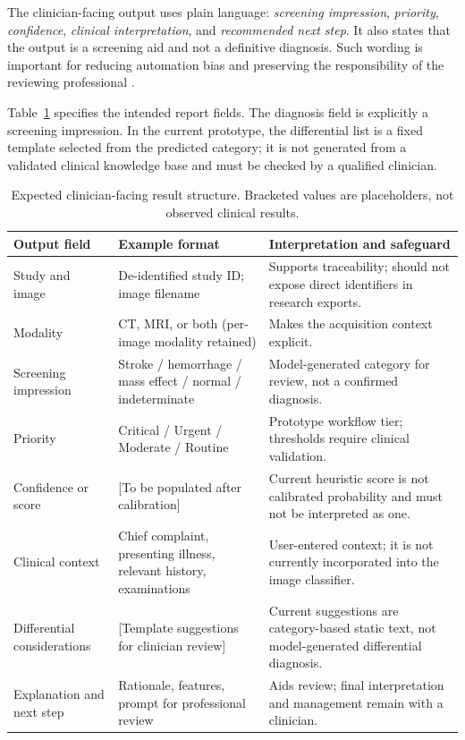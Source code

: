 \documentclass[10pt,a4paper]{article}
\begin{document}
The clinician-facing output uses plain language: \textit{screening impression}, \textit{priority}, \textit{confidence}, \textit{clinical interpretation}, and \textit{recommended next step}. It also states that the output is a screening aid and not a definitive diagnosis. Such wording is important for reducing automation bias and preserving the responsibility of the reviewing professional \citep{amann2020,sendak2020}.

Table~\ref{tab:expected-output} specifies the intended report fields. The diagnosis field is explicitly a screening impression. In the current prototype, the differential list is a fixed template selected from the predicted category; it is not generated from a validated clinical knowledge base and must be checked by a qualified clinician.
\begin{table}[t]
\centering
\small
\caption{Expected clinician-facing result structure. Bracketed values are placeholders, not observed clinical results.}
\label{tab:expected-output}
\begin{tabular}{p{}p{}p{}}
\toprule
Output field & Example format & Interpretation and safeguard \\
\midrule
Study and image & De-identified study ID; image filename & Supports traceability; should not expose direct identifiers in research exports. \\
Modality & CT, MRI, or both (per-image modality retained) & Makes the acquisition context explicit. \\
Screening impression & Stroke / hemorrhage / mass effect / normal / indeterminate & Model-generated category for review, not a confirmed diagnosis. \\
Priority & Critical / Urgent / Moderate / Routine & Prototype workflow tier; thresholds require clinical validation. \\
Confidence or score & [To be populated after calibration] & Current heuristic score is not calibrated probability and must not be interpreted as one. \\
Clinical context & Chief complaint, presenting illness, relevant history, examinations & User-entered context; it is not currently incorporated into the image classifier. \\
Differential considerations & [Template suggestions for clinician review] & Current suggestions are category-based static text, not model-generated differential diagnosis. \\
Explanation and next step & Rationale, features, prompt for professional review & Aids review; final interpretation and management remain with a clinician. \\
\bottomrule
\end{tabular}
\end{table}
\end{document}

